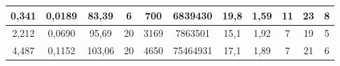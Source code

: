 \begin{sidewaystable}[]
\begin{tabular}{|c|c|c|c|c|ccccc|c|}
    0,341                                                                   & 0,0189                                                                 & 83,39                                                                & 6                                                               & 700                                                             & \multicolumn{1}{c|}{6839430}                                                         & \multicolumn{1}{c|}{19,8}                                                                    & \multicolumn{1}{c|}{1,59}                                                                 & \multicolumn{1}{c|}{11}                                                                    & 23                                                                    & 8                                                              \\ \hline
    2,212                                                                   & 0,0690                                                                 & 95,69                                                                & 20                                                              & 3169                                                            & \multicolumn{1}{c|}{7863501}                                                         & \multicolumn{1}{c|}{15,1}                                                                    & \multicolumn{1}{c|}{1,92}                                                                 & \multicolumn{1}{c|}{7}                                                                     & 19                                                                    & 5                                                              \\ \hline
    4,487                                                                   & 0,1152                                                                 & 103,06                                                               & 20                                                              & 4650                                                            & \multicolumn{1}{c|}{75464931}                                                        & \multicolumn{1}{c|}{17,1}                                                                    & \multicolumn{1}{c|}{1,89}                                                                 & \multicolumn{1}{c|}{7}                                                                     & 21                                                                    & 6                                                              \\ \hline

\end{tabular}
\end{sidewaystable}
